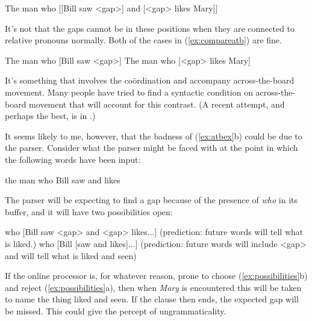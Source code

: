 {\begin{exe}
	\ex \label{ex:badgpatt} 
	The man who [[Bill saw <gap>] and [<gap> likes Mary]]
\end{exe}
It's not that the gaps cannot be in these positions when they are connected to relative pronouns normally. Both of the cases in (\ref{ex:compareatb}) are fine.
\begin{exe}
	\raggedright
	\ex \label{ex:compareatb} 
	\begin{xlist}
		\ex The man who [Bill saw <gap>]
		\ex The man who [<gap> likes Mary]
	\end{xlist}
\end{exe}
It's something that involves the co\"ordination and accompany across-the-board movement. Many people have tried to find a syntactic condition on across-the-board movement that will account for this contrast. (A recent attempt, and perhaps the best, is in \citealt{Citko:2020}.)

It seems likely to me, however, that the badness of (\ref{ex:atbex}b) could be due to the parser. Consider what the parser might be faced with at the point in which the following words have been input:
\begin{exe}
	\raggedright
	\ex \label{ex:stage1} the man who Bill saw and likes
\end{exe}
The parser will be expecting to find a gap because of the presence of \emph{who} in its buffer, and it will have two possibilities open:
\begin{exe}
	\raggedright
	\ex \label{ex:possibilities} 
	\begin{xlist}
		\ex who [Bill saw <gap> and <gap> likes...] (prediction: future words will tell what is liked.)
		\ex who [Bill [saw and likes]...] (prediction: future words will include <gap> and will tell what is liked and seen)
	\end{xlist}
\end{exe}
If the online processor is, for whatever reason, prone to choose (\ref{ex:possibilities}b) and reject (\ref{ex:possibilities}a), then when \emph{Mary} is encountered this will be taken to name the thing liked and seen. If the clause then ends, the expected gap will be missed. This could give the percept of ungrammaticality. 

}
